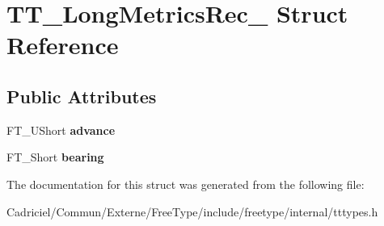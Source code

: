\hypertarget{struct_t_t___long_metrics_rec__}{\section{T\-T\-\_\-\-Long\-Metrics\-Rec\-\_\- Struct Reference}
\label{struct_t_t___long_metrics_rec__}
}
\subsection*{Public Attributes}
\begin{DoxyCompactItemize}
\item 
\hypertarget{struct_t_t___long_metrics_rec___a47100e42b52486bc374f80ed2795361d}{F\-T\-\_\-\-U\-Short {\bfseries advance}}\label{struct_t_t___long_metrics_rec___a47100e42b52486bc374f80ed2795361d}

\item 
\hypertarget{struct_t_t___long_metrics_rec___a0d74e3eb8611b0a5e89e338af35be4da}{F\-T\-\_\-\-Short {\bfseries bearing}}\label{struct_t_t___long_metrics_rec___a0d74e3eb8611b0a5e89e338af35be4da}

\end{DoxyCompactItemize}


The documentation for this struct was generated from the following file\-:\begin{DoxyCompactItemize}
\item 
Cadriciel/\-Commun/\-Externe/\-Free\-Type/include/freetype/internal/tttypes.\-h\end{DoxyCompactItemize}
